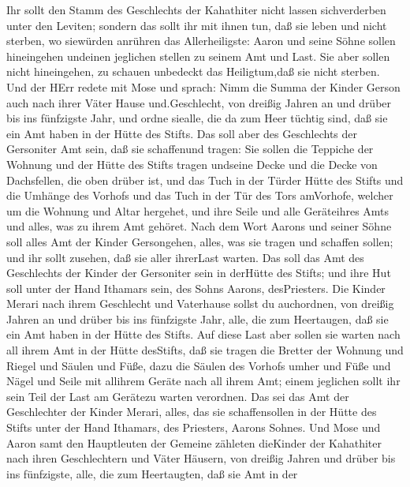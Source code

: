  Ihr sollt den Stamm des Geschlechts der Kahathiter nicht
lassen sichverderben unter den Leviten;  sondern das sollt
ihr mit ihnen tun, daß sie leben und nicht sterben, wo siewürden
anrühren das Allerheiligste: Aaron und seine Söhne sollen hineingehen
undeinen jeglichen stellen zu seinem Amt und Last.  Sie
aber sollen nicht hineingehen, zu schauen unbedeckt das Heiligtum,daß
sie nicht sterben.  Und der HErr redete mit Mose und
sprach:  Nimm die Summa der Kinder Gerson auch nach ihrer
Väter Hause und.Geschlecht,  von dreißig Jahren an und
drüber bis ins fünfzigste Jahr, und ordne siealle, die da zum Heer
tüchtig sind, daß sie ein Amt haben in der Hütte des Stifts.
 Das soll aber des Geschlechts der Gersoniter Amt sein, daß
sie schaffenund tragen:  Sie sollen die Teppiche der
Wohnung und der Hütte des Stifts tragen undseine Decke und die Decke von
Dachsfellen, die oben drüber ist, und das Tuch in der Türder Hütte des
Stifts  und die Umhänge des Vorhofs und das Tuch in der Tür
des Tors amVorhofe, welcher um die Wohnung und Altar hergehet, und ihre
Seile und alle Geräteihres Amts und alles, was zu ihrem Amt gehöret.
 Nach dem Wort Aarons und seiner Söhne soll alles Amt der
Kinder Gersongehen, alles, was sie tragen und schaffen sollen; und ihr
sollt zusehen, daß sie aller ihrerLast warten.  Das soll
das Amt des Geschlechts der Kinder der Gersoniter sein in derHütte des
Stifts; und ihre Hut soll unter der Hand Ithamars sein, des Sohns
Aarons, desPriesters.  Die Kinder Merari nach ihrem
Geschlecht und Vaterhause sollst du auchordnen,  von
dreißig Jahren an und drüber bis ins fünfzigste Jahr, alle, die zum
Heertaugen, daß sie ein Amt haben in der Hütte des Stifts. 
Auf diese Last aber sollen sie warten nach all ihrem Amt in der Hütte
desStifts, daß sie tragen die Bretter der Wohnung und Riegel und Säulen
und Füße,  dazu die Säulen des Vorhofs umher und Füße und
Nägel und Seile mit allihrem Geräte nach all ihrem Amt; einem jeglichen
sollt ihr sein Teil der Last am Gerätezu warten verordnen. 
Das sei das Amt der Geschlechter der Kinder Merari, alles, das sie
schaffensollen in der Hütte des Stifts unter der Hand Ithamars, des
Priesters, Aarons Sohnes.  Und Mose und Aaron samt den
Hauptleuten der Gemeine zähleten dieKinder der Kahathiter nach ihren
Geschlechtern und Väter Häusern,  von dreißig Jahren und
drüber bis ins fünfzigste, alle, die zum Heertaugten, daß sie Amt in der
